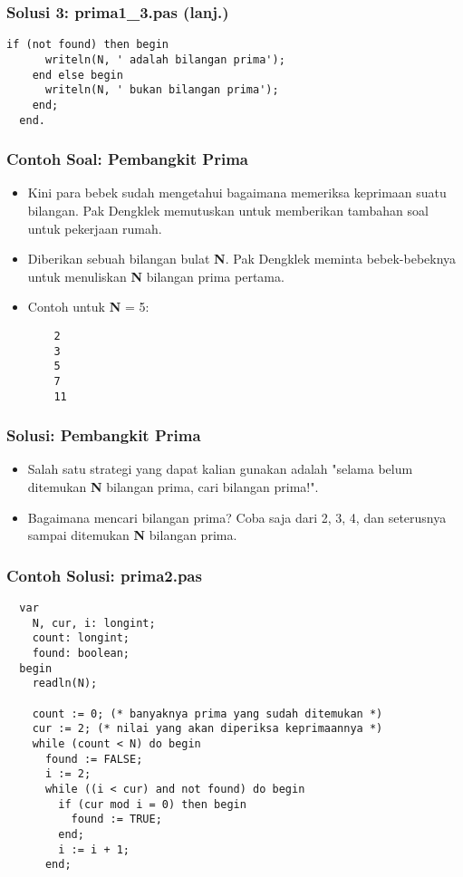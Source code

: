 \begin{frame}[fragile]
\frametitle{Solusi 3: prima1\_3.pas (lanj.)}
  \begin{lstlisting}[gobble=2]
    if (not found) then begin
      writeln(N, ' adalah bilangan prima');
    end else begin
      writeln(N, ' bukan bilangan prima');
    end;
  end.
  \end{lstlisting}
\end{frame}

\begin{frame}[fragile]
\frametitle{Contoh Soal: Pembangkit Prima}
\begin{itemize}
  \item Kini para bebek sudah mengetahui bagaimana memeriksa keprimaan suatu bilangan. Pak Dengklek memutuskan untuk memberikan tambahan soal untuk pekerjaan rumah.
  \item Diberikan sebuah bilangan bulat \textbf{N}. Pak Dengklek meminta bebek-bebeknya untuk menuliskan \textbf{N} bilangan prima pertama.
  \item Contoh untuk \textbf{N} = 5:
  \begin{lstlisting}
    2
    3
    5
    7
    11
  \end{lstlisting}
\end{itemize}
\end{frame}

\begin{frame}
\frametitle{Solusi: Pembangkit Prima}
\begin{itemize}
  \item Salah satu strategi yang dapat kalian gunakan adalah "selama belum ditemukan \textbf{N} bilangan prima, cari bilangan prima!".
  \item Bagaimana mencari bilangan prima? Coba saja dari 2, 3, 4, dan seterusnya sampai ditemukan \textbf{N} bilangan prima.
\end{itemize}
\end{frame}

\begin{frame}[fragile]
\frametitle{Contoh Solusi: prima2.pas}
\begin{lstlisting}
  var
    N, cur, i: longint;
    count: longint;
    found: boolean;
  begin
    readln(N);

    count := 0; (* banyaknya prima yang sudah ditemukan *)
    cur := 2; (* nilai yang akan diperiksa keprimaannya *)
    while (count < N) do begin
      found := FALSE;
      i := 2;
      while ((i < cur) and not found) do begin
        if (cur mod i = 0) then begin
          found := TRUE;
        end;
        i := i + 1;
      end;
\end{lstlisting}
\end{frame}

